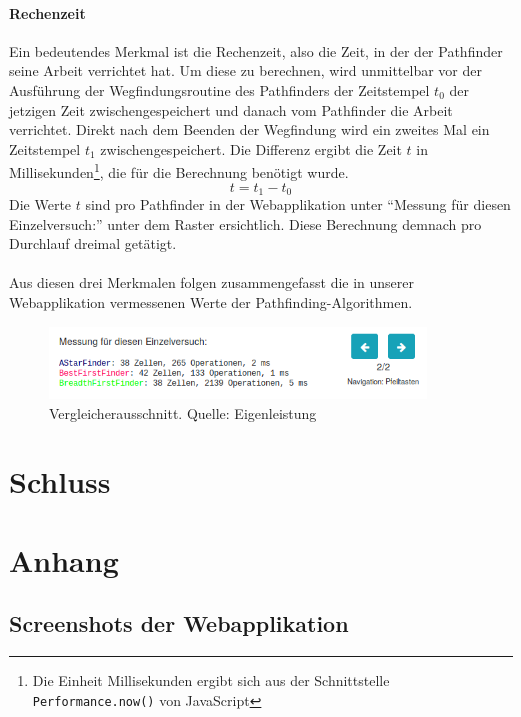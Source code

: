 \documentclass[12pt,a4paper,german]{report}
\begin{document}
\subsubsection{Rechenzeit}
Ein bedeutendes Merkmal ist die Rechenzeit, also die Zeit, in der der Pathfinder seine Arbeit verrichtet hat. 
Um diese zu berechnen, wird unmittelbar vor der Ausführung der Wegfindungsroutine des Pathfinders der Zeitstempel $t_0$ der jetzigen Zeit zwischengespeichert und danach vom Pathfinder die Arbeit verrichtet. 
Direkt nach dem Beenden der Wegfindung wird ein zweites Mal ein Zeitstempel $t_1$ zwischengespeichert. Die Differenz ergibt die Zeit $t$ in Millisekunden\footnote{Die Einheit Millisekunden ergibt sich aus der Schnittstelle \texttt{Performance.now()} von JavaScript}, die für die Berechnung benötigt wurde.
\begin{equation}
  t = t_1 - t_0
\end{equation}
Die Werte $t$ sind pro Pathfinder in der Webapplikation unter ``Messung für diesen Einzelversuch:'' unter dem Raster ersichtlich. Diese Berechnung demnach pro Durchlauf dreimal getätigt.
\\\\
Aus diesen drei Merkmalen folgen zusammengefasst die in unserer Webapplikation vermessenen Werte der Pathfinding-Algorithmen.
\begin{figure}[H]
  \centering
  \includegraphics[width=10cm]{measurements_single}
  \caption[Ausschnitt aus dem Pathfinding-Vergleicher für einzelne Vergleiche.]{Vergleicherausschnitt. Quelle: Eigenleistung}
  \label{fig:gui_konzept_comparator}
\end{figure}


\chapter{Schluss}

\chapter{Anhang}
\section{Screenshots der Webapplikation}
\end{document}
